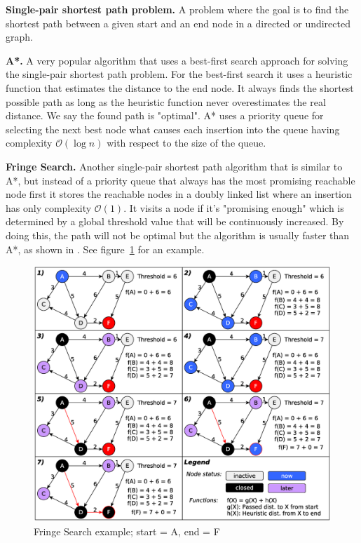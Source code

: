 \documentclass[letterpaper]{article}
\newcommand{\mypar}[1]{{\bf #1.}}
\begin{document}
\mypar{Single-pair shortest path problem}
A problem where the goal is to find the shortest path between a given start and an end node in a directed or undirected graph.

\mypar{A*}
A very popular algorithm that uses a best-first search approach for solving the single-pair shortest path problem. For the best-first search it uses a heuristic function that estimates the distance to the end node. It always finds the shortest possible path as long as the heuristic function never overestimates the real distance. We say the found path is "optimal". A* uses a priority queue for selecting the next best node what causes each insertion into the queue having complexity $\mathcal{O}(\log n)$ with respect to the size of the queue.

\mypar{Fringe Search}
Another single-pair shortest path algorithm that is similar to A*, but instead of a priority queue that always has the most promising reachable node first it stores the reachable nodes in a doubly linked list where an insertion has only complexity $\mathcal{O}(1)$. It visits a node if it's "promising enough" which is determined by a global threshold value that will be continuously increased. By doing this, the path will not be optimal but the algorithm is usually faster than A*, as shown in \cite{fringe:05}. See figure~\ref{fig:algo} for an example.
\begin{figure}[h]\centering
  \includegraphics[scale=0.245]{fringe_rep.eps}
  \caption{Fringe Search example; start = A, end = F \label{fig:algo}}
\end{figure}
\end{document}
